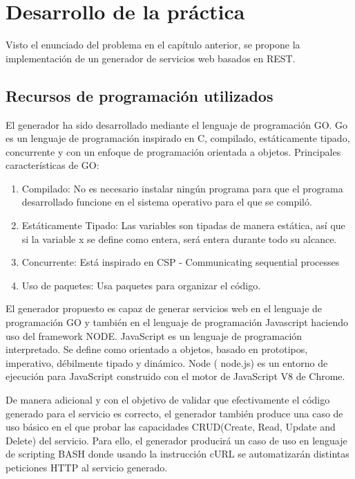 \documentclass[a4paper,11pt]{book}
\begin{document}
\chapter{Desarrollo de la práctica }

Visto el enunciado del problema en el capítulo anterior, se propone la implementación de un generador de servicios web basados en REST. 

\section{Recursos de programación utilizados}

El generador ha sido desarrollado mediante el lenguaje de programación GO\cite{go}.  Go es un lenguaje de programación inspirado en C, compilado, estáticamente tipado, concurrente y con un enfoque de programación orientada a objetos.  Principales características de GO:

\begin{enumerate}
\item Compilado: No es necesario instalar ningún programa para que el programa desarrollado funcione en el sistema operativo para el que se compiló. 
\item Estáticamente Tipado: Las variables son tipadas de manera estática, así que si la variable x se define como entera, será entera durante todo su alcance.
\item Concurrente: Está inspirado en CSP - Communicating sequential processes\cite{csp}
\item Uso de paquetes: Usa paquetes para organizar el código.
\end{enumerate}

El generador propuesto es capaz de generar servicios web en el lenguaje de programación GO y también en el lenguaje de programación Javascript\cite{js} haciendo uso del framework NODE. JavaScript es un lenguaje de programación interpretado. Se define como orientado a objetos, basado en prototipos, imperativo, débilmente tipado y dinámico. Node\cite{node} ( node.js)  es un entorno de ejecución para JavaScript construido con el motor de JavaScript V8 de Chrome.

De manera adicional y con el objetivo de validar que efectivamente el código generado para el servicio es correcto, el generador también produce una caso de uso básico en el que probar las capacidades CRUD(Create, Read, Update and Delete) del servicio. Para ello, el generador producirá un caso de uso en lenguaje de scripting BASH\cite{bash} donde usando la instrucción cURL\cite{curl} se automatizarán distintas peticiones HTTP al servicio generado. 
\end{document}
